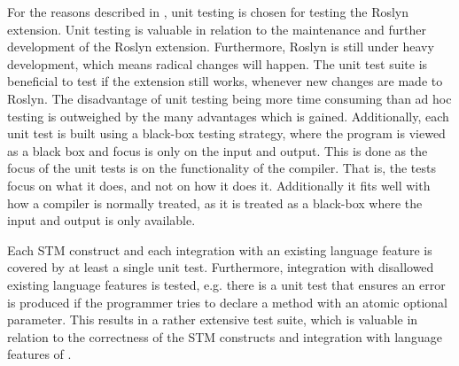 For the reasons described in , unit testing is chosen for testing the Roslyn extension. Unit testing is valuable in relation to the maintenance and further development of the Roslyn extension. Furthermore, Roslyn is still under heavy development, which means radical changes will happen. The unit test suite is beneficial to test if the extension still works, whenever new changes are made to Roslyn. The disadvantage of unit testing being more time consuming than ad hoc testing is outweighed by the many advantages which is gained. Additionally, each unit test is built using a black-box testing strategy\cite[p. 87]{graham2008foundations}, where the program is viewed as a black box and focus is only on the input and output. This is done as the focus of the unit tests is on the functionality of the compiler. That is, the tests focus on what it does, and not on how it does it. Additionally it fits well with how a compiler is normally treated, as it is treated as a black-box where the input and output is only available.

Each \ac{STM} construct and each integration with an existing language feature is covered by at least a single unit test. Furthermore, integration with disallowed existing language features is tested, e.g. there is a unit test that ensures an error is produced if the programmer tries to declare a method with an atomic optional parameter. This results in a rather extensive test suite, which is valuable in relation to the correctness of the \ac{STM} constructs and integration with language features of \stmname.

